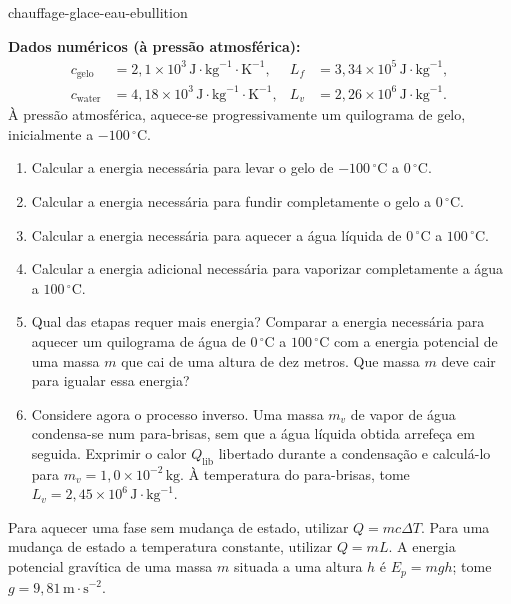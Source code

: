 
\begin{exo}{chauffage-glace-eau-ebullition}

\textbf{Dados numéricos (à pressão atmosférica):}
\[
\begin{aligned}
c_{\text{gelo}} &= 2{,}1\times10^3\,\text{J}\!\cdot\!\text{kg}^{-1}\!\cdot\!\text{K}^{-1},
& L_f &= 3{,}34\times10^5\,\text{J}\!\cdot\!\text{kg}^{-1},\\
c_{\text{water}} &= 4{,}18\times10^3\,\text{J}\!\cdot\!\text{kg}^{-1}\!\cdot\!\text{K}^{-1},
& L_v &= 2{,}26\times10^6\,\text{J}\!\cdot\!\text{kg}^{-1}.
\end{aligned}
\]
À pressão atmosférica, aquece-se progressivamente um quilograma de gelo, inicialmente a $-100\,{}^\circ\text{C}$.

\begin{enumerate}
  \item Calcular a energia necessária para levar o gelo de $-100\,{}^\circ\text{C}$ a $0\,{}^\circ\text{C}$.
  \item Calcular a energia necessária para fundir completamente o gelo a $0\,{}^\circ\text{C}$.
  \item Calcular a energia necessária para aquecer a água líquida de $0\,{}^\circ\text{C}$ a $100\,{}^\circ\text{C}$.
  \item Calcular a energia adicional necessária para vaporizar completamente a água a $100\,{}^\circ\text{C}$.
  \item Qual das etapas requer mais energia? Comparar a energia necessária para aquecer um quilograma de água de $0\,{}^\circ\text{C}$ a $100\,{}^\circ\text{C}$ com a energia potencial de uma massa $m$ que cai de uma altura de dez metros. Que massa $m$ deve cair para igualar essa energia?
  \item Considere agora o processo inverso. Uma massa $m_v$ de vapor de água condensa-se num para-brisas, sem que a água líquida obtida arrefeça em seguida. Exprimir o calor $Q_{\text{lib}}$ libertado durante a condensação e calculá-lo para $m_v=1{,}0\times10^{-2}\,\text{kg}$. À temperatura do para-brisas, tome $L_v=2{,}45\times10^6\,\text{J}\!\cdot\!\text{kg}^{-1}$.
\end{enumerate}

\begin{indication}
Para aquecer uma fase sem mudança de estado, utilizar $Q=mc\Delta T$. Para uma mudança de estado a temperatura constante, utilizar $Q=mL$. A energia potencial gravítica de uma massa $m$ situada a uma altura $h$ é $E_p=mgh$; tome $g=9{,}81\,\text{m}\!\cdot\!\text{s}^{-2}$.
\end{indication}


\end{exo}
